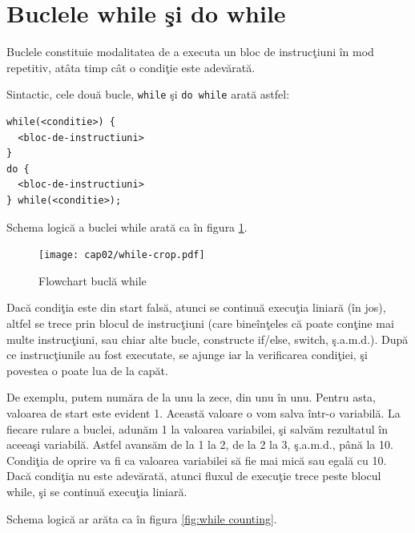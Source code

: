 \section{Buclele while şi do while}
Buclele constituie modalitatea de a executa un bloc de instrucţiuni
în mod repetitiv, atâta timp cât o condiţie este adevărată.

Sintactic, cele două bucle, \texttt{while} şi \texttt{do while} arată astfel:
\begin{lstlisting}
while(<conditie>) {
  <bloc-de-instructiuni>
}
do {
  <bloc-de-instructiuni>
} while(<conditie>);
\end{lstlisting}

Schema logică a buclei while arată ca în figura \ref{fig:flowchart while loop}.

\begin{figure}[ht!]
  \centering
    \texttt{[image: cap02/while-crop.pdf]}
  \caption{Flowchart buclă while}
  \label{fig:flowchart while loop}
\end{figure}

Dacă condiţia este din start falsă, atunci se continuă execuţia liniară ({\glqq}în jos{\grqq}),
altfel se trece prin blocul de instrucţiuni (care bineînţeles că poate
conţine mai multe instrucţiuni, sau chiar alte bucle, constructe if/else, switch, ş.a.m.d.).
După ce instrucţiunile au fost executate, se ajunge iar la verificarea condiţiei,
şi povestea o poate lua de la capăt.


De exemplu, putem număra de la unu la zece, din unu în unu. Pentru asta,
valoarea de start este evident 1. Această valoare o vom salva într-o variabilă.
La fiecare rulare a buclei, adunăm 1 la valoarea variabilei, şi salvăm
rezultatul în aceeaşi variabilă. Astfel avansăm de la 1 la 2, de la 2 la 3,
ş.a.m.d., până la 10. Condiţia de oprire va fi ca valoarea variabilei să
fie mai mică sau egală cu 10. Dacă condiţia nu este adevărată, atunci fluxul de execuţie
{\glqq}trece peste{\grqq} blocul while, şi se continuă execuţia liniară.

Schema logică ar arăta ca în figura \ref{fig:while counting}.

